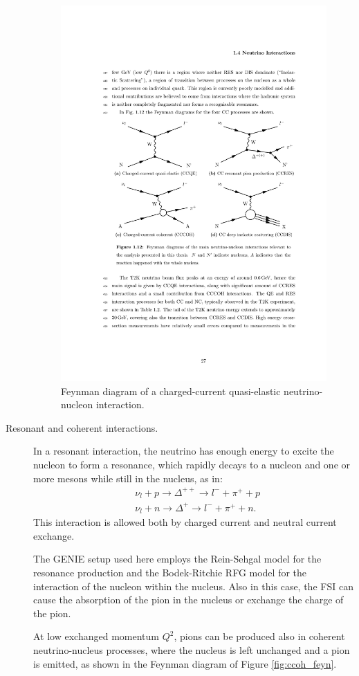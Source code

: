 \begin{description}
\begin{figure}[htbp]
    \centering
    \includegraphics[width=0.65\linewidth]{figures/ccqe_feyn.pdf}
    \caption{Feynman diagram of a charged-current quasi-elastic neutrino-nucleon interaction.}
    \label{fig:ccqe_feyn}
\end{figure}

\item[Resonant and coherent interactions.] In a resonant interaction, the neutrino has enough energy to excite the nucleon to form a resonance, which rapidly decays to a nucleon and one or more mesons while still in the nucleus, as in:
\begin{align}
&\nu_l + p \rightarrow \Delta^{++} \rightarrow l^- + \pi^+ + p \\
&\nu_l + n \rightarrow \Delta^{+} \rightarrow l^- + \pi^+ + n.
\end{align}
This interaction is allowed both by charged current and neutral current exchange.

The GENIE setup used here employs the Rein-Sehgal model \cite{Rein:1980wg} for the resonance production and the Bodek-Ritchie RFG model \cite{Bodek:2011ps} for the interaction of the nucleon within the nucleus. Also in this case, the FSI can cause the absorption of the pion in the nucleus or exchange the charge of the pion.

At low exchanged momentum $Q^2$, pions can be produced also in coherent neutrino-nucleus processes, where the nucleus is left unchanged and a pion is emitted, as shown in the Feynman diagram of Figure \ref{fig:ccoh_feyn}.


\end{description}
